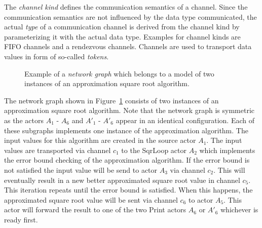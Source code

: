 %

The \emph{channel kind} defines the communication semantics of a channel.
Since the communication semantics are not influenced by the
data type communicated, the actual \emph{type} of a communication
channel is derived from the channel kind by parameterizing it with
the actual data type. Examples for channel kinds are
FIFO channels and a rendezvous channels. Channels are used to
transport data values in form of so-called \emph{tokens}.

\begin{figure}[t]
\centering
\resizebox{1.0\textwidth}{!}{}
\caption{\label{fig:ng-moc}Example of a \emph{network graph} which belongs
to a model of two instances of an approximation square root algorithm.}
\end{figure}

The network graph shown in Figure~\ref{fig:ng-moc} consists
of two instances of an approximation square root algorithm. Note that the
network graph is symmetric as the actors $A_1$ - $A_6$ and $A'_1$ - $A'_6$
appear in an identical configuration. Each of these subgraphs implements
one instance of the approximation algorithm. The input values for this algorithm
are created in the source actor $A_1$. The input values are transported via
channel $c_1$ to the SqrLoop actor $A_2$ which implements the error bound checking
of the approximation algorithm. If the error bound is not satisfied the input
value will be send to actor $A_3$ via channel $c_2$. This will eventually result in
a new better approximated square root value in channel $c_5$. This iteration repeats
until the error bound is satisfied. When this happens, the approximated
square root value will be sent via channel $c_6$ to actor $A_5$. This actor
will forward the result to one of the two Print actors $A_6$ or $A'_6$
whichever is ready first.

